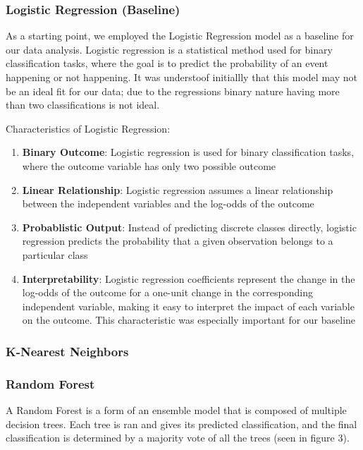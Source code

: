 \documentclass[10pt,sigconf,letterpaper,nonacm]{acmart}
\begin{document}
\subsubsection{Logistic Regression (Baseline)}
As a starting point, we employed the Logistic Regression model as a baseline for our data analysis. Logistic regression is a statistical method used for binary classification tasks, where the goal is to predict the probability of an event happening or not happening.
It was understoof initiallly that this model may not be an ideal fit for our data; due to the regressions binary nature having more than two classifications is not ideal.

Characteristics of Logistic Regression:
\begin{enumerate}
  \item \textbf{Binary Outcome}: Logistic regression is used for binary classification tasks, where the outcome variable has only two possible outcome
  \item \textbf{Linear Relationship}: Logistic regression assumes a linear relationship between the independent variables and the log-odds of the outcome
  \item \textbf{Probablistic Output}: Instead of predicting discrete classes directly, logistic regression predicts the probability that a given observation belongs to a particular class
  \item \textbf{Interpretability}: Logistic regression coefficients represent the change in the log-odds of the outcome for a one-unit change in the corresponding independent variable, making it easy to interpret the impact of each variable on the outcome. This characteristic was especially important for our baseline
\end{enumerate}


\subsubsection{K-Nearest Neighbors}

\subsubsection{Random Forest}
A Random Forest is a form of an ensemble model that is composed of multiple decision trees. Each tree is ran and gives its predicted classification, and the final classification is determined by a majority vote of all the trees (seen in figure 3).
\end{document}
